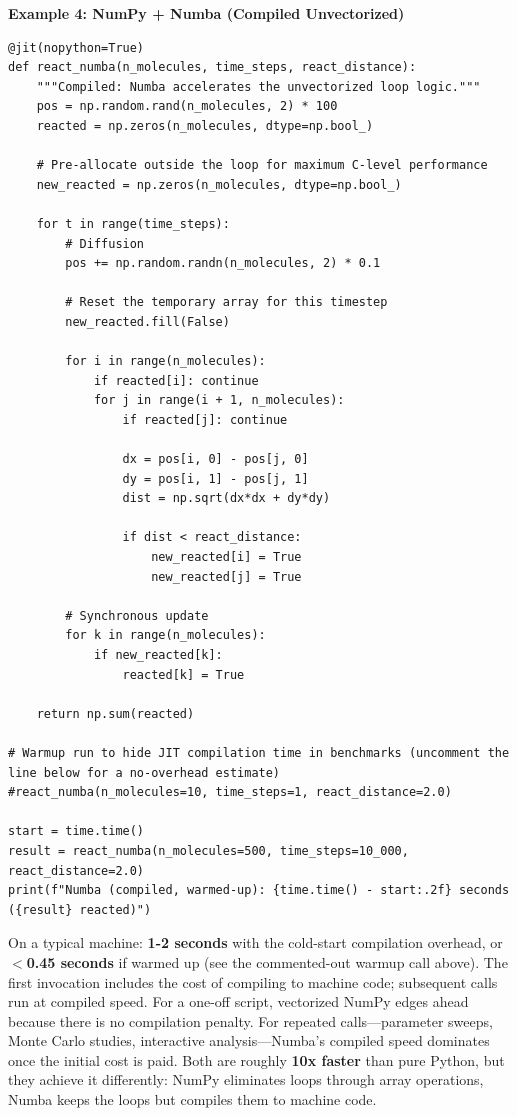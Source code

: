 \newpage 
\noindent \textbf{Example 4: NumPy + Numba (Compiled Unvectorized)}

\begin{lstlisting}
@jit(nopython=True)
def react_numba(n_molecules, time_steps, react_distance):
    """Compiled: Numba accelerates the unvectorized loop logic."""
    pos = np.random.rand(n_molecules, 2) * 100
    reacted = np.zeros(n_molecules, dtype=np.bool_)

    # Pre-allocate outside the loop for maximum C-level performance
    new_reacted = np.zeros(n_molecules, dtype=np.bool_)

    for t in range(time_steps):
        # Diffusion
        pos += np.random.randn(n_molecules, 2) * 0.1

        # Reset the temporary array for this timestep
        new_reacted.fill(False)
        
        for i in range(n_molecules):
            if reacted[i]: continue
            for j in range(i + 1, n_molecules):
                if reacted[j]: continue
                
                dx = pos[i, 0] - pos[j, 0]
                dy = pos[i, 1] - pos[j, 1]
                dist = np.sqrt(dx*dx + dy*dy)
                
                if dist < react_distance:
                    new_reacted[i] = True
                    new_reacted[j] = True

        # Synchronous update
        for k in range(n_molecules):
            if new_reacted[k]:
                reacted[k] = True

    return np.sum(reacted)

# Warmup run to hide JIT compilation time in benchmarks (uncomment the line below for a no-overhead estimate)
#react_numba(n_molecules=10, time_steps=1, react_distance=2.0)

start = time.time()
result = react_numba(n_molecules=500, time_steps=10_000, react_distance=2.0)
print(f"Numba (compiled, warmed-up): {time.time() - start:.2f} seconds ({result} reacted)")
\end{lstlisting}

\noindent On a typical machine: \textbf{1-2 seconds} with the cold-start compilation overhead, or \textbf{$<$0.45 seconds} if warmed up (see the commented-out warmup call above). The first invocation includes the cost of compiling to machine code; subsequent calls run at compiled speed. For a one-off script, vectorized NumPy edges ahead because there is no compilation penalty. For repeated calls---parameter sweeps, Monte Carlo studies, interactive analysis---Numba's compiled speed dominates once the initial cost is paid. Both are roughly \textbf{10x faster} than pure Python, but they achieve it differently: NumPy eliminates loops through array operations, Numba keeps the loops but compiles them to machine code.


